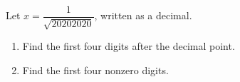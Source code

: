 Let $x=\dfrac{1}{\sqrt{20202020}}$, written as a decimal.
\begin{enumerate}
\item[(a)] Find the first four digits after the decimal point.
\item[(b)] Find the first four nonzero digits.
\end{enumerate}
